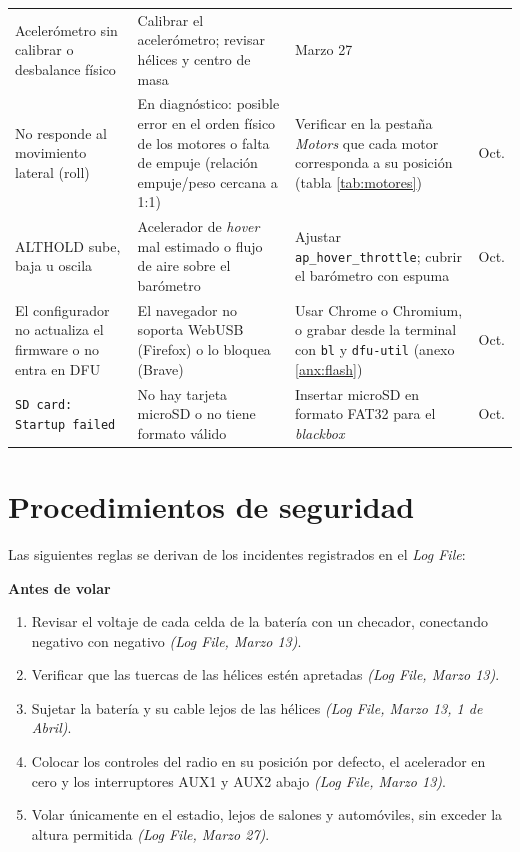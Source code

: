 \documentclass[11pt,letterpaper]{article}
\newcommand{\logref}[1]{\textit{(Log File, #1)}}
\begin{document}
\begin{table}[!h]
\begin{tabularx}{\textwidth}{@{}>{\raggedright\arraybackslash}p{3.2cm}>{\raggedright\arraybackslash}X>{\raggedright\arraybackslash}X>{\raggedright\arraybackslash}p{2.1cm}@{}}
Acelerómetro sin calibrar o desbalance físico &
Calibrar el acelerómetro; revisar hélices y centro de masa &
Marzo 27 \\
\addlinespace
No responde al movimiento lateral (roll) &
En diagnóstico: posible error en el orden físico de los motores o falta de empuje (relación empuje/peso cercana a 1:1) &
Verificar en la pestaña \textit{Motors} que cada motor corresponda a su posición (tabla \ref{tab:motores}) &
23 Oct. \\
\addlinespace
ALTHOLD sube, baja u oscila &
Acelerador de \textit{hover} mal estimado o flujo de aire sobre el barómetro &
Ajustar \texttt{ap\_hover\_throttle}; cubrir el barómetro con espuma &
23 Oct. \\
\addlinespace
El configurador no actualiza el firmware o no entra en DFU &
El navegador no soporta WebUSB (Firefox) o lo bloquea (Brave) &
Usar Chrome o Chromium, o grabar desde la terminal con \texttt{bl} y \texttt{dfu-util} (anexo \ref{anx:flash}) &
23 Oct. \\
\addlinespace
\texttt{SD card: Startup failed} &
No hay tarjeta microSD o no tiene formato válido &
Insertar microSD en formato FAT32 para el \textit{blackbox} &
13 Oct. \\
\bottomrule
\end{tabularx}
\end{table}

\section{Procedimientos de seguridad}
\label{sec:seguridad}
Las siguientes reglas se derivan de los incidentes registrados en el \textit{Log File}:

\noindent\textbf{Antes de volar}
\begin{enumerate}[nosep]
    \item Revisar el voltaje de cada celda de la batería con un checador, conectando negativo con negativo \logref{Marzo 13}.
    \item Verificar que las tuercas de las hélices estén apretadas \logref{Marzo 13}.
    \item Sujetar la batería y su cable lejos de las hélices \logref{Marzo 13, 1 de Abril}.
    \item Colocar los controles del radio en su posición por defecto, el acelerador en cero y los interruptores AUX1 y AUX2 abajo \logref{Marzo 13}.
    \item Volar únicamente en el estadio, lejos de salones y automóviles, sin exceder la altura permitida \logref{Marzo 27}.
\end{enumerate}
\end{document}
